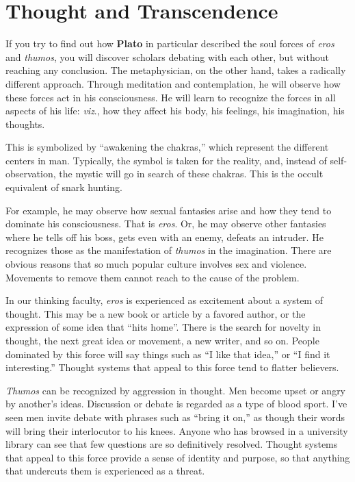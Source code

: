 \section{Thought and Transcendence}

If you try to find out how \textbf{Plato} in particular described the soul forces of \emph{eros} and \emph{thumos}, you will discover scholars debating with each other, but without reaching any conclusion. The metaphysician, on the other hand, takes a radically different approach. Through meditation and contemplation, he will observe how these forces act in his consciousness. He will learn to recognize the forces in all aspects of his life: \emph{viz}., how they affect his body, his feelings, his imagination, his thoughts.

This is symbolized by ``awakening the chakras,'' which represent the different centers in man. Typically, the symbol is taken for the reality, and, instead of self-observation, the mystic will go in search of these chakras. This is the occult equivalent of snark hunting.

For example, he may observe how sexual fantasies arise and how they tend to dominate his consciousness. That is \emph{eros}. Or, he may observe other fantasies where he tells off his boss, gets even with an enemy, defeats an intruder. He recognizes those as the manifestation of \emph{thumos} in the imagination. There are obvious reasons that so much popular culture involves sex and violence. Movements to remove them cannot reach to the cause of the problem.

In our thinking faculty, \emph{eros} is experienced as excitement about a system of thought. This may be a new book or article by a favored author, or the expression of some idea that ``hits home''. There is the search for novelty in thought, the next great idea or movement, a new writer, and so on. People dominated by this force will say things such as ``I like that idea,'' or ``I find it interesting.'' Thought systems that appeal to this force tend to flatter believers.

\emph{Thumos} can be recognized by aggression in thought. Men become upset or angry by another's ideas. Discussion or debate is regarded as a type of blood sport. I've seen men invite debate with phrases such as ``bring it on,'' as though their words will bring their interlocutor to his knees. Anyone who has browsed in a university library can see that few questions are so definitively resolved. Thought systems that appeal to this force provide a sense of identity and purpose, so that anything that undercuts them is experienced as a threat.

